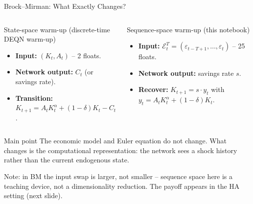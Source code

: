 \documentclass[aspectratio=169,11pt]{beamer}
\newcommand{\emphc}[1]{\textcolor{harvardcrimson}{#1}}
\newcommand{\histE}{\mathcal{E}}  %
\begin{document}
\begin{frame}[shrink=12]{Brock--Mirman: What Exactly Changes?}
\small
\begin{columns}[T]
\begin{block}{State-space warm-up (discrete-time DEQN warm-up)}
\begin{itemize}\itemsep3pt
    \item \textbf{Input:} $(K_t, A_t)$ -- 2 floats.
    \item \textbf{Network output:} $C_t$ (or savings rate).
    \item \textbf{Transition:} $K_{t+1} = A_t K_t^\alpha + (1-\delta) K_t - C_t$.
\end{itemize}
\end{block}

\begin{block}{Sequence-space warm-up (this notebook)}
\begin{itemize}\itemsep3pt
    \item \textbf{Input:} $\histE_t^T = (\varepsilon_{t-T+1}, \ldots, \varepsilon_t)$ -- 25 floats.
    \item \textbf{Network output:} savings rate $s$.
    \item \textbf{Recover:} $K_{t+1} = s\cdot y_t$ with $y_t = A_t K_t^\alpha + (1-\delta) K_t$.
\end{itemize}
\end{block}
\end{columns}

\vspace{0.30em}
\begin{alertblock}{Main point}
The \emphc{economic model and Euler equation do not change}.  What changes is the \emphc{computational representation}: the network sees a shock history rather than the current endogenous state.
\end{alertblock}

\vspace{0.20em}
{\footnotesize Note: in BM the input swap is \emphc{larger}, not smaller -- sequence space here is a teaching device, not a dimensionality reduction.  The payoff appears in the HA setting (next slide).}
\end{frame}
\end{document}
